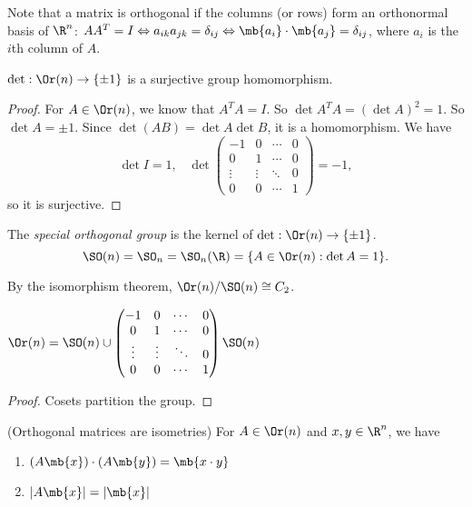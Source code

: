 \documentclass[a4pape]{article}
\begin{document}
Note that a matrix is orthogonal if the columns (or rows) form an orthonormal basis of $\R^n$: $AA^T = I\Leftrightarrow a_{ik}a_{jk} = \delta_{ij} \Leftrightarrow \mb{a_i}\cdot \mb{a_j} = \delta_{ij}$, where $a_i$ is the $i$th column of $A$.

\begin{prop}
  $\det: \Or(n) \to \{\pm 1\}$ is a surjective group homomorphism. 
\end{prop}

\begin{proof}
  For $A\in \Or(n)$, we know that $A^TA = I$. So $\det A^TA = (\det A)^2  = 1$. So $\det A = \pm 1$. Since $\det(AB) = \det A\det B$, it is a homomorphism. We have
  \[
  \det I = 1,\;\;\;\det 
  \begin{pmatrix}
    -1 & 0 &\cdots & 0\\
    0 & 1 & \cdots & 0\\
    \vdots & \vdots & \ddots & 0\\
    0 & 0 & \cdots & 1
  \end{pmatrix} = -1,
  \]
  so it is surjective.
\end{proof}

\begin{defi}
  The \emph{special orthogonal group} is the kernel of $\det: \Or(n) \to \{\pm 1\}$.
  \[
  \SO(n) =\SO_n = \SO_n(\R) = \{A\in \Or(n): \det A = 1\}.
  \]
\end{defi}
By the isomorphism theorem, $\Or(n)/\SO(n) \cong C_2$.

\begin{lemma}
  $\Or(n) = \SO(n) \cup
    \begin{pmatrix}
    -1 & 0 &\cdots & 0\\
    0 & 1 & \cdots & 0\\
    \vdots & \vdots & \ddots & 0\\
    0 & 0 & \cdots &1
  \end{pmatrix}\SO(n)$
\end{lemma}

\begin{proof}
  Cosets partition the group.
\end{proof}

\begin{lemma}
  (Orthogonal matrices are isometries) For $A\in \Or(n)$ and $x, y\in \R^n$, we have
  \begin{enumerate}
  \item $(A\mb{x})\cdot (A\mb{y}) = \mb{x\cdot y}$
  \item $|A\mb{x}| = |\mb{x}|$
  \end{enumerate}
\end{lemma}
\end{document}

